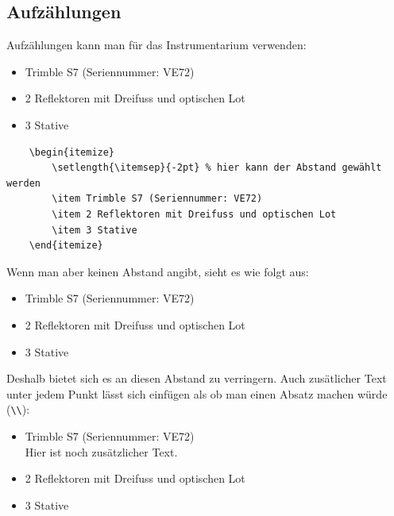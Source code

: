 \subsection{Aufzählungen}

Aufzählungen kann man für das Instrumentarium verwenden:

\begin{itemize}	
	\setlength{\itemsep}{-2pt} %
	\item Trimble S7 (Seriennummer: VE72)
	\item 2 Reflektoren mit Dreifuss und optischen Lot
	\item 3 Stative
\end{itemize}

\begin{verbatim}
    \begin{itemize}	
    	\setlength{\itemsep}{-2pt} % hier kann der Abstand gewählt werden
    	\item Trimble S7 (Seriennummer: VE72)
    	\item 2 Reflektoren mit Dreifuss und optischen Lot
    	\item 3 Stative
    \end{itemize}
\end{verbatim}

Wenn man aber keinen Abstand angibt, sieht es wie folgt aus:

\begin{itemize}	
	\item Trimble S7 (Seriennummer: VE72)
	\item 2 Reflektoren mit Dreifuss und optischen Lot
	\item 3 Stative
\end{itemize}

Deshalb bietet sich es an diesen Abstand zu verringern. Auch zusätlicher Text unter jedem Punkt lässt sich einfügen als ob man einen Absatz machen würde (\verb|\\|):

\begin{itemize}	
	\setlength{\itemsep}{-2pt} %
	\item Trimble S7 (Seriennummer: VE72)\\
	Hier ist noch zusätzlicher Text.
	\item 2 Reflektoren mit Dreifuss und optischen Lot
	\item 3 Stative
\end{itemize}


